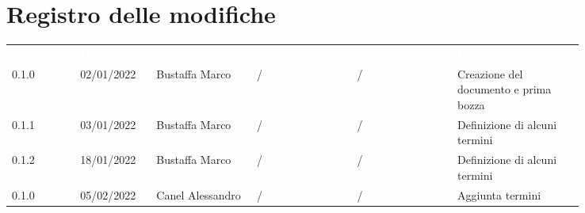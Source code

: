 \section*{Registro delle modifiche}

{\renewcommand{\arraystretch}{1.5}
\scriptsize
\begin{tabular}{p{0.10\linewidth}p{0.10\linewidth}p{0.15\linewidth}p{0.15\linewidth}p{0.15\linewidth}p{0.19\linewidth}}
	\rowcolor[RGB]{33, 73, 50}
	\textcolor{white}{\textbf{Versione}} & \textcolor{white}{\textbf{Data}} &
	\textcolor{white}{\textbf{Redattore}} & \textcolor{white}{\textbf{Verificatore}} &
	\textcolor{white}{\textbf{Approvatore}} & \textcolor{white}{\textbf{Descrizione}}\\
	\rowcolor[RGB]{216, 235, 171}
	0.1.0 & 02/01/2022 & Bustaffa Marco & / &/& Creazione del documento e prima bozza\\
	\rowcolor[RGB]{233, 245, 206}
	0.1.1 & 03/01/2022 & Bustaffa Marco & / &/& Definizione di alcuni termini\\
	\rowcolor[RGB]{216, 235, 171}
	0.1.2 & 18/01/2022 & Bustaffa Marco & / &/& Definizione di alcuni termini\\
	\rowcolor[RGB]{233, 245, 206}
	0.1.0 & 05/02/2022 & Canel Alessandro & / &/& Aggiunta termini\\

\end{tabular}
}
